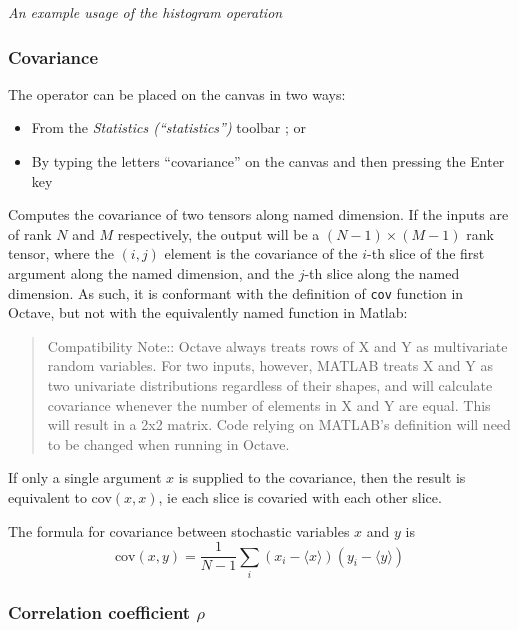 \begin{center}
{\em An example usage of the histogram operation} 
\par\end{center}

\subsubsection{Covariance}

\label{Operation:covariance}


The operator can be placed on the canvas in two ways:
\begin{itemize}
\item From the \emph{Statistics (``statistics'')} toolbar ;
or 
\item By typing the letters ``covariance'' on the canvas and then pressing
the Enter key
\end{itemize}

Computes the covariance of two tensors along named dimension. If the
inputs are of rank $N$ and $M$ respectively, the output will be
a $(N-1)\times(M-1)$ rank tensor, where the $(i,j)$ element is the
covariance of the $i$-th slice of the first argument along the named
dimension, and the $j$-th slice along the named dimension. As such,
it is conformant with the definition of \texttt{cov} function in Octave,
but not with the equivalently named function in Matlab: 
\begin{quote}
Compatibility Note:: Octave always treats rows of X and Y as multivariate
random variables. For two inputs, however, MATLAB treats X and Y as
two univariate distributions regardless of their shapes, and will
calculate covariance whenever the number of elements in X and Y are
equal. This will result in a 2x2 matrix. Code relying on MATLAB's
definition will need to be changed when running in Octave. 
\end{quote}
If only a single argument $x$ is supplied to the covariance, then
the result is equivalent to cov$(x,x)$, ie each slice is covaried
with each other slice.

The formula for covariance between stochastic variables $x$ and $y$
is 
\[
\mathrm{cov}(x,y)=\frac{1}{N-1}\sum_{i}(x_{i}-\langle x\rangle)(y_{i}-\langle y\rangle)
\]

\subsubsection{Correlation coefficient $\rho$}\label{Operation:correlation}

